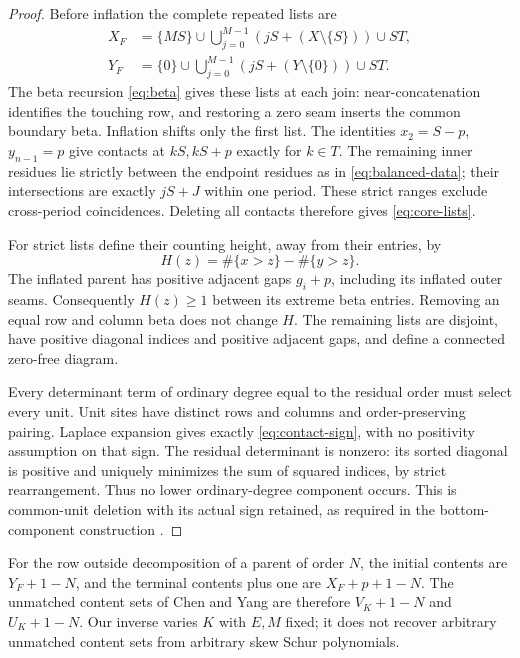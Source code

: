 \documentclass[11pt,a4paper]{amsart}
\numberwithin{equation}{section}
\theoremstyle{plain}
\theoremstyle{definition}
\begin{document}
\begin{proof}
Before inflation the complete repeated lists are
\begin{equation}\label{eq:full-repeated-lists}
 \begin{aligned}
 X_F&=\{MS\}\cup\bigcup_{j=0}^{M-1}(jS+(X\setminus\{S\}))\cup ST,\\
 Y_F&=\{0\}\cup\bigcup_{j=0}^{M-1}(jS+(Y\setminus\{0\}))\cup ST.
 \end{aligned}
\end{equation}
The beta recursion \eqref{eq:beta} gives these lists at each join: near-concatenation identifies the touching row, and restoring a zero seam inserts the common boundary beta.  Inflation shifts only the first list.  The identities \(x_2=S-p\), \(y_{n-1}=p\) give contacts at \(kS,kS+p\) exactly for \(k\in T\).  The remaining inner residues lie strictly between the endpoint residues as in \eqref{eq:balanced-data}; their intersections are exactly \(jS+J\) within one period.  These strict ranges exclude cross-period coincidences.  Deleting all contacts therefore gives \eqref{eq:core-lists}.

For strict lists define their counting height, away from their entries, by
\begin{equation}\label{eq:height}
 H(z)=\#\{x>z\}-\#\{y>z\}.
\end{equation}
The inflated parent has positive adjacent gaps \(g_i+p\), including its inflated outer seams.  Consequently \(H(z)\ge1\) between its extreme beta entries.  Removing an equal row and column beta does not change \(H\).  The remaining lists are disjoint, have positive diagonal indices and positive adjacent gaps, and define a connected zero-free diagram.

Every determinant term of ordinary degree equal to the residual order must select every unit.  Unit sites have distinct rows and columns and order-preserving pairing.  Laplace expansion gives exactly \eqref{eq:contact-sign}, with no positivity assumption on that sign.  The residual determinant is nonzero: its sorted diagonal is positive and uniquely minimizes the sum of squared indices, by strict rearrangement.  Thus no lower ordinary-degree component occurs.  This is common-unit deletion with its actual sign retained, as required in the bottom-component construction \cite{Clifford2004BottomSchur}.
\end{proof}

For the row outside decomposition of a parent of order \(N\), the initial contents are \(Y_F+1-N\), and the terminal contents plus one are \(X_F+p+1-N\).  The unmatched content sets of Chen and Yang \cite{Chen2008ZrankConjecture} are therefore \(V_K+1-N\) and \(U_K+1-N\).  Our inverse varies \(K\) with \(E,M\) fixed; it does not recover arbitrary unmatched content sets from arbitrary skew Schur polynomials.
\end{document}
